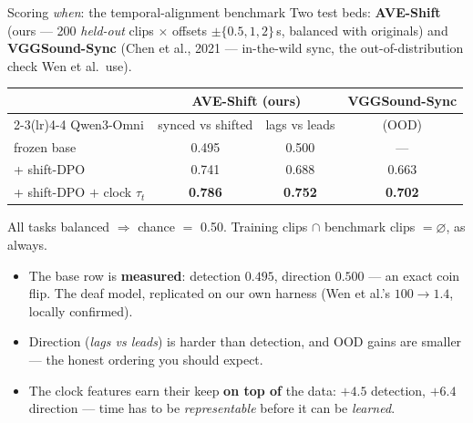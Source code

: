 \documentclass[aspectratio=169,11pt]{beamer}
\begin{document}
\begin{frame}{Scoring \emph{when}: the temporal-alignment benchmark}
{\small Two test beds: \textbf{AVE-Shift} (ours --- 200 \emph{held-out} clips $\times$ offsets
$\pm\{0.5,1,2\}$\,s, balanced with originals) and \textbf{VGGSound-Sync} (Chen et al., 2021 ---
in-the-wild sync, the out-of-distribution check Wen et al.\ use).}
\vspace{0.3em}
\centering
\renewcommand{\arraystretch}{1.2}
\small
\begin{tabular}{l cc c}
\toprule
& \multicolumn{2}{c}{AVE-Shift (ours)} & VGGSound-Sync \\
\cmidrule(lr){2-3}\cmidrule(lr){4-4}
Qwen3-Omni & synced vs shifted & lags vs leads & (OOD) \\
\midrule
frozen base                    & 0.495 & 0.500 & --- \\ %
+ shift-DPO                    & 0.741 & 0.688 & 0.663 \\ %
+ shift-DPO $+$ clock $\tau_t$ & \textbf{0.786} & \textbf{0.752} & \textbf{0.702} \\ %
\bottomrule
\end{tabular}
\par\vspace{0.3em}
{\scriptsize All tasks balanced $\Rightarrow$ chance $=$ 0.50. Training clips $\cap$ benchmark clips
$=\varnothing$, as always.}
\vfill
\begin{itemize}\small
\item The base row is \textbf{measured}: detection $0.495$, direction $0.500$ --- an exact coin
flip. The deaf model, replicated on our own harness (Wen et al.'s $100\to1.4$, locally confirmed).
\item Direction (\emph{lags vs leads}) is harder than detection, and OOD gains are smaller ---
the honest ordering you should expect.
\item The clock features earn their keep \textbf{on top of} the data: $+4.5$ detection, $+6.4$
direction --- time has to be \emph{representable} before it can be \emph{learned}.
\end{itemize}
\end{frame}

\end{document}
